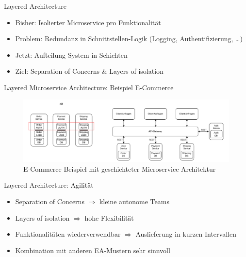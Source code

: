 
\begin{frame}{Layered Architecture}
    \begin{itemize}
        \item Bisher: Isolierter Microservice pro Funktionalität
        \item Problem: Redundanz in Schnittstellen-Logik (Logging, Authentifizierung, \ldots)
        \item Jetzt: Aufteilung System in Schichten
        \item Ziel: Separation of Concerns \& Layers of isolation
    \end{itemize}
\end{frame}

\begin{frame}{Layered Microservice Architecture: Beispiel E-Commerce}
    \begin{figure}[!h]
        \centering
        \includegraphics[scale=0.55]{imglib/layered/ecommerce-example}
        \caption{E-Commerce Beispiel mit geschichteter Microservice Architektur}
        \label{fig:layered}
    \end{figure}
\end{frame}

\begin{frame}{Layered Architecture: Agilität}
    \begin{itemize}
        \item Separation of Concerns $\Rightarrow$ kleine autonome Teams
        \item Layers of isolation $\Rightarrow$ hohe Flexibilität
        \item Funktionalitäten wiederverwendbar $\Rightarrow$ Auslieferung in kurzen Intervallen
        \item Kombination mit anderen EA-Mustern sehr sinnvoll
    \end{itemize}
\end{frame}
